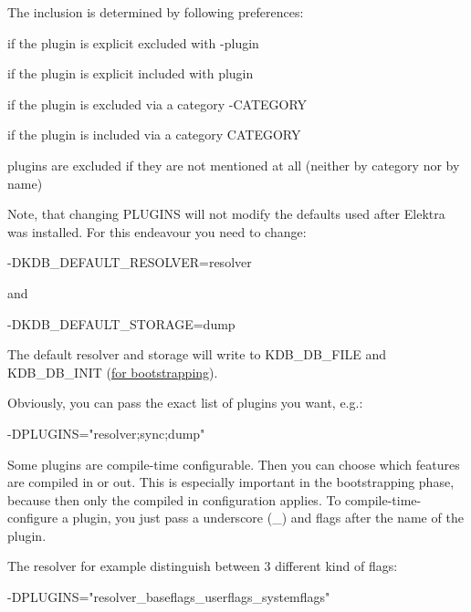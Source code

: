 The inclusion is determined by following preferences\+:


\begin{DoxyEnumerate}
\item if the plugin is explicit excluded with {\ttfamily -\/plugin}
\item if the plugin is explicit included with {\ttfamily plugin}
\item if the plugin is excluded via a category {\ttfamily -\/\+C\+A\+T\+E\+G\+O\+RY}
\item if the plugin is included via a category {\ttfamily C\+A\+T\+E\+G\+O\+RY}
\item plugins are excluded if they are not mentioned at all (neither by category nor by name)
\end{DoxyEnumerate}

Note, that changing {\ttfamily P\+L\+U\+G\+I\+NS} will not modify the defaults used after Elektra was installed. For this endeavour you need to change\+:


\begin{DoxyCode}
-DKDB\_DEFAULT\_RESOLVER=resolver
\end{DoxyCode}


and


\begin{DoxyCode}
-DKDB\_DEFAULT\_STORAGE=dump
\end{DoxyCode}


The default resolver and storage will write to {\ttfamily K\+D\+B\+\_\+\+D\+B\+\_\+\+F\+I\+LE} and {\ttfamily K\+D\+B\+\_\+\+D\+B\+\_\+\+I\+N\+IT} (\hyperlink{doc_help_elektra-bootstrapping_md}{for bootstrapping}).

Obviously, you can pass the exact list of plugins you want, e.\+g.\+:


\begin{DoxyCode}
-DPLUGINS="resolver;sync;dump"
\end{DoxyCode}


Some plugins are compile-\/time configurable. Then you can choose which features are compiled in or out. This is especially important in the bootstrapping phase, because then only the compiled in configuration applies. To compile-\/time-\/configure a plugin, you just pass a underscore ({\ttfamily \+\_\+}) and flags after the name of the plugin.

The resolver for example distinguish between 3 different kind of flags\+:


\begin{DoxyCode}
-DPLUGINS="resolver\_baseflags\_userflags\_systemflags"
\end{DoxyCode}


